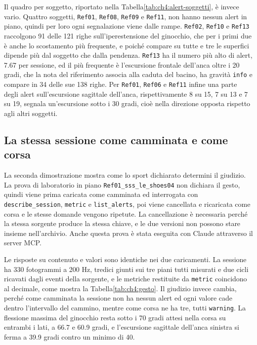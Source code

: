 Il quadro per soggetto, riportato nella Tabella\ref{tab:ch4:alert-soggetti}, è
invece vario. Quattro soggetti, \texttt{Ref01}, \texttt{Ref08}, \texttt{Ref09} e
\texttt{Ref11}, non hanno nessun alert in piano, quindi per loro ogni
segnalazione viene dalle rampe. \texttt{Ref02}, \texttt{Ref10} e \texttt{Ref13}
raccolgono 91 delle 121 righe sull'iperestensione del ginocchio, che per i primi
due è anche lo scostamento più frequente, e poiché compare su tutte e tre le
superfici dipende più dal soggetto che dalla pendenza. \texttt{Ref13} ha il numero
più alto di alert, 7.67 per sessione, ed il più frequente è l'escursione frontale
dell'anca oltre i 20 gradi, che la nota del riferimento associa alla caduta del
bacino, ha gravità \texttt{info} e compare in 34 delle sue 138 righe. Per
\texttt{Ref01}, \texttt{Ref06} e \texttt{Ref11} infine una parte degli alert
sull'escursione sagittale dell'anca, rispettivamente 8 su 15, 7 su 13 e 7 su 19,
segnala un'escursione sotto i 30 gradi, cioè nella direzione opposta rispetto agli
altri soggetti.

\subsection{La stessa sessione come camminata e come corsa}
\label{subsec:ch4:demo-gesto}

La seconda dimostrazione mostra come lo sport dichiarato determini il giudizio.
La prova di laboratorio in piano \texttt{Ref01\_sss\_le\_shoes04} non dichiara il
gesto, quindi viene prima caricata come camminata ed interrogata con
\texttt{describe\_session}, \texttt{metric} e \texttt{list\_alerts}, poi viene
cancellata e ricaricata come corsa e le stesse domande vengono ripetute. La
cancellazione è necessaria perché la stessa sorgente produce la stessa chiave, e
le due versioni non possono stare insieme nell'archivio. Anche questa prova è
stata eseguita con Claude attraverso il server MCP.

Le risposte su contenuto e valori sono identiche nei due caricamenti. La sessione
ha 330 fotogrammi a 200 Hz, tredici giunti sui tre piani tutti misurati e due
cicli ricavati dagli eventi della sorgente, e le metriche restituite da
\texttt{metric} coincidono al decimale, come mostra la
Tabella\ref{tab:ch4:gesto}. Il giudizio invece cambia, perché come camminata la sessione
non ha nessun alert ed ogni valore cade dentro l'intervallo del cammino, mentre
come corsa ne ha tre, tutti \texttt{warning}. La flessione massima del ginocchio
resta sotto i 70 gradi attesi nella corsa su entrambi i lati, a 66.7 e 60.9 gradi,
e l'escursione sagittale dell'anca sinistra si ferma a 39.9 gradi contro un minimo
di 40.

